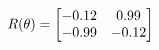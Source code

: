 \documentclass[preview]{standalone}
\begin{document}
\begin{align*}
\special{dvisvgm:raw <g id='unique000'>}R(\theta) = \begin{bmatrix}-0.12 & 0.99\\-0.99 & -0.12\end{bmatrix}\special{dvisvgm:raw </g>}
\end{align*}
\end{document}
